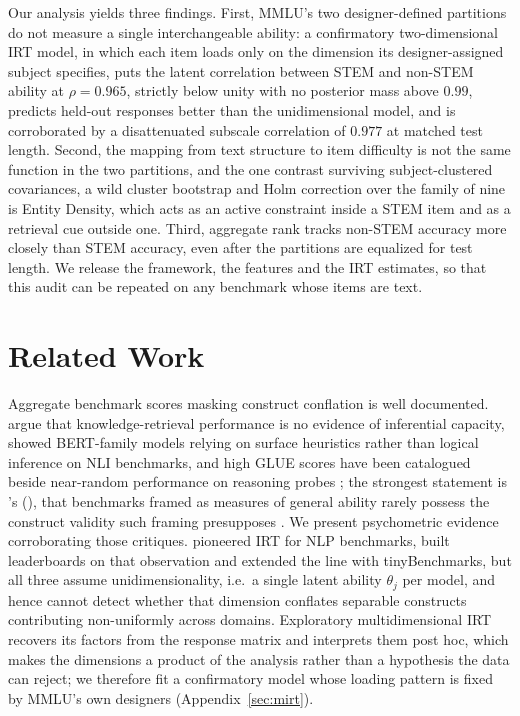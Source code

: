 Our analysis yields three findings. First, MMLU's two designer-defined partitions do not measure a single interchangeable ability: a confirmatory two-dimensional IRT model, in which each item loads only on the dimension its designer-assigned subject specifies, puts the latent correlation between STEM and non-STEM ability at $\rho = 0.965$, strictly below unity with no posterior mass above $0.99$, predicts held-out responses better than the unidimensional model, and is corroborated by a disattenuated subscale correlation of $0.977$ at matched test length. Second, the mapping from text structure to item difficulty is not the same function in the two partitions, and the one contrast surviving subject-clustered covariances, a wild cluster bootstrap and Holm correction over the family of nine is Entity Density, which acts as an active constraint inside a STEM item and as a retrieval cue outside one. Third, aggregate rank tracks non-STEM accuracy more closely than STEM accuracy, even after the partitions are equalized for test length. We release the framework, the features and the IRT estimates, so that this audit can be repeated on any benchmark whose items are text.

\section{Related Work}\label{related-work}

Aggregate benchmark scores masking construct conflation is well documented. \citet{bender2021} argue that knowledge-retrieval performance is no evidence of inferential capacity, \citet{mccoy2019} showed BERT-family models relying on surface heuristics rather than logical inference on NLI benchmarks, and high GLUE scores have been catalogued beside near-random performance on reasoning probes \citep{rogers2020}; the strongest statement is \citeauthor{bowman2021}'s (\citeyear{bowman2021}), that benchmarks framed as measures of general ability rarely possess the construct validity such framing presupposes \citep[see also][]{raji2021}. We present psychometric evidence corroborating those critiques. \citet{lalor2019} pioneered IRT for NLP benchmarks, \citet{rodriguez2021} built leaderboards on that observation and \citet{polo2024} extended the line with tinyBenchmarks, but all three assume unidimensionality, i.e.~a single latent ability $\theta_{j}$ per model, and hence cannot detect whether that dimension conflates separable constructs contributing non-uniformly across domains. Exploratory multidimensional IRT \citep{reckase2009} recovers its factors from the response matrix and interprets them post hoc, which makes the dimensions a product of the analysis rather than a hypothesis the data can reject; we therefore fit a confirmatory model whose loading pattern is fixed by MMLU's own designers (Appendix~\ref{sec:mirt}).

